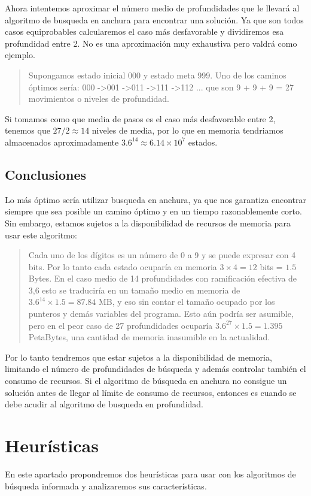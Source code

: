 \documentclass[12pt]{article}
\begin{document}
Ahora intentemos aproximar el número medio de profundidades que le llevará al algoritmo de busqueda en anchura para encontrar una solución. Ya que son todos casos equiprobables calcularemos el caso más desfavorable y dividiremos esa profundidad entre 2. No es una aproximación muy exhaustiva pero valdrá como ejemplo.
\begin{quote}
Supongamos estado inicial 000 y estado meta 999. Uno de los caminos óptimos sería:
000 -\textgreater 001 -\textgreater  011 -\textgreater  111 -\textgreater  112 ...
que son 9 + 9 + 9 = 27 movimientos o niveles de profundidad.
\end{quote}
Si tomamos como que media de pasos es el caso más desfavorable entre 2, tenemos que $27/2 \approx 14$ niveles de media, por lo que en memoria tendriamos almacenados aproximadamente $3.6^{14}\approx 6.14 \times 10^7$ estados.
\subsection{Conclusiones}
Lo más óptimo sería utilizar busqueda en anchura, ya que nos garantiza encontrar siempre que sea posible un camino óptimo y en un tiempo razonablemente corto. Sin embargo, estamos sujetos a la disponibilidad de recursos de memoria para usar este algoritmo:
\begin{quote}
	Cada uno de los dígitos es un número de 0 a 9 y se puede expresar con 4 bits. Por lo tanto cada estado ocuparía en memoria $3\times 4 = 12$ bits = $1.5$ Bytes. En el caso medio de 14 profundidades con ramificación efectiva de 3,6 esto se traduciría en un tamaño medio en memoria de $3.6^{14} \times 1.5 = 87.84$ MB, y eso sin contar el tamaño ocupado por los punteros y demás variables del programa. Esto aún podría ser asumible, pero en el peor caso de 27 profundidades ocuparía $3.6^{27} \times 1.5 = 1.395$ PetaBytes, una cantidad de memoria inasumible en la actualidad. 
\end{quote}
Por lo tanto tendremos que estar sujetos a la disponibilidad de memoria,  limitando el número de profundidades de búsqueda y además controlar también el consumo de recursos. Si el algoritmo de búsqueda en anchura no consigue un solución antes de llegar al límite de consumo de recursos, entonces es cuando se debe acudir al algoritmo de busqueda en profundidad.
\section{Heurísticas}
En este apartado propondremos dos heurísticas para usar con los algoritmos de búsqueda informada y analizaremos sus características.
\end{document}

